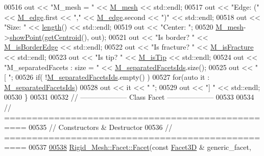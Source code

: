 \begin{DoxyCode}
00516     out << \textcolor{stringliteral}{"M\_mesh = "} << \hyperlink{classFVCode3D_1_1Rigid__Mesh_1_1Edge_a64bb5c3aa3654d3234f555da2414f3b5}{M\_mesh} << std::endl;
00517     out << \textcolor{stringliteral}{"Edge: ("} << \hyperlink{classFVCode3D_1_1Rigid__Mesh_1_1Edge_af8573366715c188a54326703bbf90e72}{M\_edge}.first << \textcolor{stringliteral}{","} << \hyperlink{classFVCode3D_1_1Rigid__Mesh_1_1Edge_af8573366715c188a54326703bbf90e72}{M\_edge}.second << \textcolor{stringliteral}{")"} << std::endl;
00518     out << \textcolor{stringliteral}{"Size: "} << \hyperlink{classFVCode3D_1_1Rigid__Mesh_1_1Edge_a3ef3549d709a4b537437f9e3e7f3e67b}{length}() << std::endl;
00519     out << \textcolor{stringliteral}{"Center: "};
00520     \hyperlink{classFVCode3D_1_1Rigid__Mesh_1_1Edge_a64bb5c3aa3654d3234f555da2414f3b5}{M\_mesh}->\hyperlink{classFVCode3D_1_1Rigid__Mesh_a3bbdb25ce1eddaf66316487bfc05e089}{showPoint}(\hyperlink{classFVCode3D_1_1Rigid__Mesh_1_1Edge_a53b678074c79d7d3115096da7c47e68e}{getCentroid}(), out);
00521     out << \textcolor{stringliteral}{"Is border? "} << \hyperlink{classFVCode3D_1_1Rigid__Mesh_1_1Edge_af97600008d97c4db6f57fba531d8cd5c}{M\_isBorderEdge} << std::endl;
00522     out << \textcolor{stringliteral}{"Is fracture? "} << \hyperlink{classFVCode3D_1_1Rigid__Mesh_1_1Edge_ae0356f38073c9139078e3caa7a87c587}{M\_isFracture} << std::endl;
00523     out << \textcolor{stringliteral}{"Is tip? "} << \hyperlink{classFVCode3D_1_1Rigid__Mesh_1_1Edge_a077a64a08f7be9e35735561a8e93a9ac}{M\_isTip} << std::endl;
00524     out << \textcolor{stringliteral}{"M\_separatedFacets : size = "} << \hyperlink{classFVCode3D_1_1Rigid__Mesh_1_1Edge_a4fd7d85c6c2a87a784ac65618785faf5}{M\_separatedFacetsIds}.size();
00525     out << \textcolor{stringliteral}{"    [ "};
00526     \textcolor{keywordflow}{if}( !\hyperlink{classFVCode3D_1_1Rigid__Mesh_1_1Edge_a4fd7d85c6c2a87a784ac65618785faf5}{M\_separatedFacetsIds}.empty() )
00527         \textcolor{keywordflow}{for}(\textcolor{keyword}{auto} it : \hyperlink{classFVCode3D_1_1Rigid__Mesh_1_1Edge_a4fd7d85c6c2a87a784ac65618785faf5}{M\_separatedFacetsIds})
00528             out << it << \textcolor{stringliteral}{" "};
00529     out << \textcolor{stringliteral}{"] "} << std::endl;
00530 \}
00531 
00532 \textcolor{comment}{// --------------------   Class Facet   --------------------}
00533 
00534 \textcolor{comment}{// ==================================================}
00535 \textcolor{comment}{// Constructors & Destructor}
00536 \textcolor{comment}{// ==================================================}
00537 
\hypertarget{RigidMesh_8cpp_source.tex_l00538}{}\hyperlink{classFVCode3D_1_1Rigid__Mesh_1_1Facet_a789226114be7f356e43c9abfc6bcb88e}{00538} \hyperlink{classFVCode3D_1_1Rigid__Mesh_1_1Facet_a8f4a989d7d4512571ef9ddb01a965001}{Rigid\_Mesh::Facet::Facet}(\textcolor{keyword}{const} \hyperlink{classFVCode3D_1_1Mesh3D_1_1Facet3D}{Facet3D} & generic\_facet, 

\end{DoxyCode}
